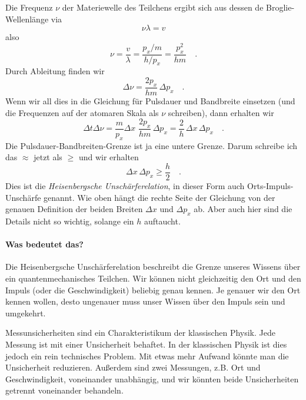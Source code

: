 Die Frequenz $\nu$ der Materiewelle des Teilchens ergibt sich aus dessen de Broglie-Wellenlänge via
\begin{equation}
    \nu \lambda = v
\end{equation}
also 
\begin{equation}
    \nu = \frac{v}{\lambda } = \frac{p_x / m}{h / p_x} = \frac{p_x^2}{h m} \quad .
\end{equation}
Durch Ableitung finden wir
\begin{equation}
    \Delta \nu = \frac{2 p_x}{h m} \, \Delta p_x \quad .
\end{equation}
Wenn wir all dies in die Gleichung für Pulsdauer und Bandbreite einsetzen (und die Frequenzen auf der atomaren Skala als $\nu$ schreiben), dann erhalten wir
\begin{equation}
    \Delta t \Delta \nu = \frac{m}{p_x} \Delta x \, \, \frac{2 p_x}{h m} \, \Delta p_x = \frac{2}{h} \, \Delta x \, \Delta p_x   \quad .
\end{equation}
Die Pulsdauer-Bandbreiten-Grenze ist ja eine untere Grenze. Darum schreibe ich das $\approx$ jetzt als $\ge$ und wir erhalten
\begin{equation}
    \Delta x \, \Delta p_x  \ge  \frac{h}{2} \quad .
\end{equation}
Dies ist die \emph{Heisenbergsche Unschärferelation}, in dieser Form auch Orts-Impuls-Unschärfe genannt. Wie oben hängt die rechte Seite der Gleichung von der genauen Definition der beiden Breiten $\Delta x$ und $\Delta p_x$ ab. Aber auch hier sind die Details nicht so wichtig, solange ein $h$ auftaucht.

\paragraph*{Was bedeutet das?} Die Heisenbergsche Unschärferelation beschreibt die Grenze unseres Wissens über ein quantenmechanisches Teilchen. Wir können nicht gleichzeitig den Ort und den Impuls (oder die Geschwindigkeit) beliebig genau kennen. Je genauer wir den Ort kennen wollen, desto ungenauer muss unser Wissen über den Impuls sein und umgekehrt.

Messunsicherheiten sind ein Charakteristikum der klassischen Physik. Jede Messung ist mit einer Unsicherheit behaftet. In der klassischen Physik ist dies jedoch ein rein technisches Problem. Mit etwas mehr Aufwand könnte man die Unsicherheit reduzieren. Außerdem sind zwei Messungen, z.B. Ort und Geschwindigkeit, voneinander unabhängig, und wir könnten beide Unsicherheiten getrennt voneinander behandeln.

